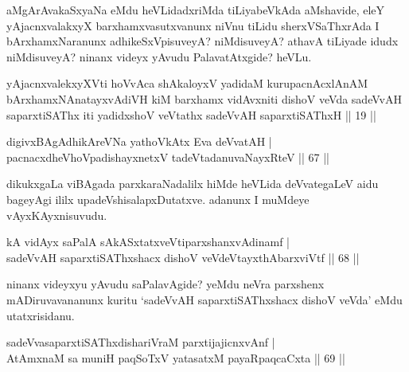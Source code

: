 \begin{artha}
aMgArAvakaSxyaNa eMdu heVLidadxriMda tiLiyabeVkAda aMshavide, eleY yAjacnxvalakxyX barxhamxvasutxvanunx niVnu tiLidu sherxVSaThxrAda I bArxhamxNaranunx adhikeSxVpisuveyA? niMdisuveyA? athavA tiLiyade idudx niMdisuveyA? ninanx videyx yAvudu PalavatAtxgide? heVLu.
\end{artha}


\begin{kandikeshl}
yAjacnxvalekxyXVti hoVvAca shAkaloyxV yadidaM kurupacnAcxlAnAM bArxhamxNAnatayxvAdiVH kiM barxhamx vidAvxniti dishoV veVda sadeVvAH saparxtiSAThx iti yadidxshoV veVtathx sadeVvAH saparxtiSAThxH || 19 ||
\end{kandikeshl}


\begin{shl}
digivxBAgAdhikAreVNa yathoVkAtx Eva deVvatAH |\\
pacnacxdheVhoVpadishayxnetxV tadeVtadanuvaNayxRteV \hfill || 67 ||
\end{shl}

\begin{artha}
dikukxgaLa viBAgada parxkaraNadalilx hiMde heVLida deVvategaLeV aidu bageyAgi ililx upadeVshisalapxDutatxve. adanunx I muMdeye vAyxKAyxnisuvudu.
\end{artha}

\begin{shl}
kA vidAyx saPalA sAkASxtatxveVtiparxshanxvAdinamf |\\
sadeVvAH saparxtiSAThxshacx dishoV veVdeVtayxthAbarxviVtf \hfill || 68 ||
\end{shl}

\begin{artha}
ninanx videyxyu yAvudu saPalavAgide? yeMdu neVra parxshenx mADiruvavananunx kuritu `sadeVvAH saparxtiSAThxshacx dishoV veVda' eMdu utatxrisidanu.
\end{artha}


\begin{shl}
sadeVvasaparxtiSAThxdishariVraM parxtijajicnxvAnf |\\
AtAmxnaM sa muniH paqSoTxV yatasatxM payaRpaqcaCxta \hfill || 69 ||
\end{shl}

